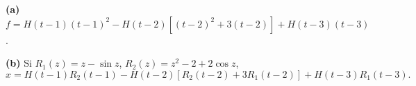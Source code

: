 \noindent\textbf{(a)} \(f=H(t-1)(t-1)^2-H(t-2)[(t-2)^2+3(t-2)]+H(t-3)(t-3)\).

\noindent\textbf{(b)} Si \(R_1(z)=z-\sin z\), \(R_2(z)=z^2-2+2\cos z\),
\[x=H(t-1)R_2(t-1)-H(t-2)[R_2(t-2)+3R_1(t-2)]+H(t-3)R_1(t-3).\]

